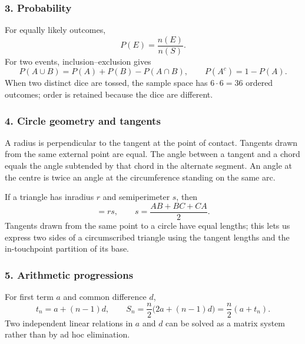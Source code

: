 \subsubsection*{3. Probability}
For equally likely outcomes,
\begin{equation}
P(E)=\frac{n(E)}{n(S)}.
\label{eq:prob-classical}
\end{equation}
For two events, inclusion--exclusion gives
\begin{equation}
P(A\cup B)=P(A)+P(B)-P(A\cap B),\qquad
P(A^c)=1-P(A).
\label{eq:prob-union}
\end{equation}
When two distinct dice are tossed, the sample space has $6\cdot6=36$ ordered outcomes; order is retained because the dice are different.

\subsubsection*{4. Circle geometry and tangents}
A radius is perpendicular to the tangent at the point of contact. Tangents drawn from the same external point are equal. The angle between a tangent and a chord equals the angle subtended by that chord in the alternate segment. An angle at the centre is twice an angle at the circumference standing on the same arc.

If a triangle has inradius $r$ and semiperimeter $s$, then
\begin{equation}
[ABC]=rs,\qquad s=\frac{AB+BC+CA}{2}.
\label{eq:triangle-inradius}
\end{equation}
Tangents drawn from the same point to a circle have equal lengths; this lets us express two sides of a circumscribed triangle using the tangent lengths and the in-touchpoint partition of its base.

\subsubsection*{5. Arithmetic progressions}
For first term $a$ and common difference $d$,
\begin{equation}
t_n=a+(n-1)d,\qquad S_n=\frac{n}{2}\bigl(2a+(n-1)d\bigr)=\frac n2(a+t_n).
\label{eq:ap}
\end{equation}
Two independent linear relations in $a$ and $d$ can be solved as a matrix system rather than by ad hoc elimination.

